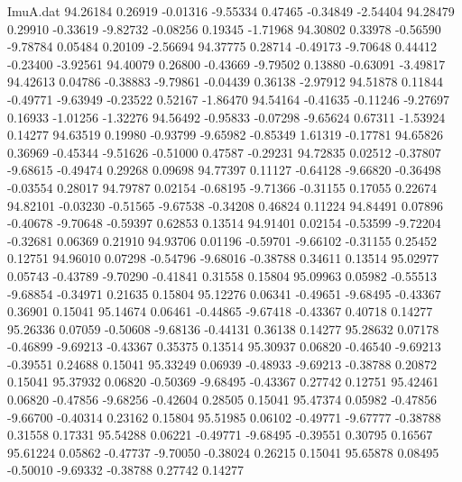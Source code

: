 \begin{filecontents}{ImuA.dat}
  94.26184    0.26919   -0.01316   -9.55334    0.47465   -0.34849   -2.54404
  94.28479    0.29910   -0.33619   -9.82732   -0.08256    0.19345   -1.71968
  94.30802    0.33978   -0.56590   -9.78784    0.05484    0.20109   -2.56694
  94.37775    0.28714   -0.49173   -9.70648    0.44412   -0.23400   -3.92561
  94.40079    0.26800   -0.43669   -9.79502    0.13880   -0.63091   -3.49817
  94.42613    0.04786   -0.38883   -9.79861   -0.04439    0.36138   -2.97912
  94.51878    0.11844   -0.49771   -9.63949   -0.23522    0.52167   -1.86470
  94.54164   -0.41635   -0.11246   -9.27697    0.16933   -1.01256   -1.32276
  94.56492   -0.95833   -0.07298   -9.65624    0.67311   -1.53924    0.14277
  94.63519    0.19980   -0.93799   -9.65982   -0.85349    1.61319   -0.17781
  94.65826    0.36969   -0.45344   -9.51626   -0.51000    0.47587   -0.29231
  94.72835    0.02512   -0.37807   -9.68615   -0.49474    0.29268    0.09698
  94.77397    0.11127   -0.64128   -9.66820   -0.36498   -0.03554    0.28017
  94.79787    0.02154   -0.68195   -9.71366   -0.31155    0.17055    0.22674
  94.82101   -0.03230   -0.51565   -9.67538   -0.34208    0.46824    0.11224
  94.84491    0.07896   -0.40678   -9.70648   -0.59397    0.62853    0.13514
  94.91401    0.02154   -0.53599   -9.72204   -0.32681    0.06369    0.21910
  94.93706    0.01196   -0.59701   -9.66102   -0.31155    0.25452    0.12751
  94.96010    0.07298   -0.54796   -9.68016   -0.38788    0.34611    0.13514
  95.02977    0.05743   -0.43789   -9.70290   -0.41841    0.31558    0.15804
  95.09963    0.05982   -0.55513   -9.68854   -0.34971    0.21635    0.15804
  95.12276    0.06341   -0.49651   -9.68495   -0.43367    0.36901    0.15041
  95.14674    0.06461   -0.44865   -9.67418   -0.43367    0.40718    0.14277
  95.26336    0.07059   -0.50608   -9.68136   -0.44131    0.36138    0.14277
  95.28632    0.07178   -0.46899   -9.69213   -0.43367    0.35375    0.13514
  95.30937    0.06820   -0.46540   -9.69213   -0.39551    0.24688    0.15041
  95.33249    0.06939   -0.48933   -9.69213   -0.38788    0.20872    0.15041
  95.37932    0.06820   -0.50369   -9.68495   -0.43367    0.27742    0.12751
  95.42461    0.06820   -0.47856   -9.68256   -0.42604    0.28505    0.15041
  95.47374    0.05982   -0.47856   -9.66700   -0.40314    0.23162    0.15804
  95.51985    0.06102   -0.49771   -9.67777   -0.38788    0.31558    0.17331
  95.54288    0.06221   -0.49771   -9.68495   -0.39551    0.30795    0.16567
  95.61224    0.05862   -0.47737   -9.70050   -0.38024    0.26215    0.15041
  95.65878    0.08495   -0.50010   -9.69332   -0.38788    0.27742    0.14277

\end{filecontents}
